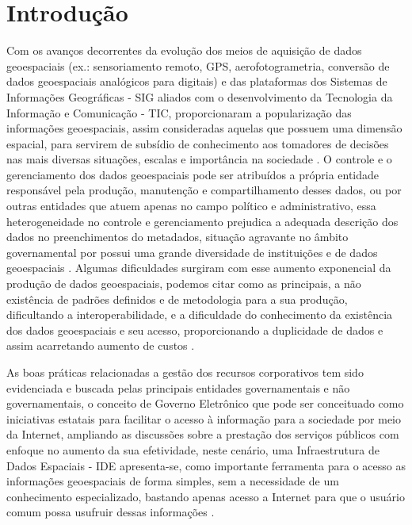 \documentclass[preprint,authoryear,11pt]{elsarticle}
\begin{document}
\section{Introdução}
\label{sec1}
\begin{multicols}{2}

Com os avanços decorrentes da evolução dos meios de aquisição de dados geoespaciais (ex.: sensoriamento remoto, GPS, aerofotogrametria, conversão de dados geoespaciais analógicos para digitais) e das plataformas dos Sistemas de Informações Geográficas - SIG aliados com o desenvolvimento da Tecnologia da Informação e Comunicação - TIC, proporcionaram a popularização das informações geoespaciais, assim consideradas aquelas que possuem uma dimensão espacial, para servirem de subsídio de conhecimento aos tomadores de decisões nas mais diversas situações, escalas e importância na sociedade \citep{Macharis2014AFlanders, Kounadi2016AdaptiveDatasets, Bejar2012AnInfrastructures, Borzacchiello2013EstimatingE-Cadastres, Hamylton2012DevelopmentSeychelles}. O controle e o gerenciamento dos dados geoespaciais pode ser atribuídos a própria entidade responsável pela produção, manutenção e compartilhamento desses dados, ou por outras entidades que atuem apenas no campo político e administrativo, essa heterogeneidade no controle e gerenciamento prejudica a adequada descrição dos dados no preenchimentos do metadados, situação agravante no âmbito governamental por possui uma grande diversidade de instituições e de dados geoespaciais \citep{Grus2011AnGoals}. Algumas dificuldades surgiram com esse aumento exponencial da produção de dados geoespaciais, podemos citar como as principais, a não existência de padrões definidos e de metodologia para a sua produção, dificultando a interoperabilidade, e a dificuldade do conhecimento da existência dos dados geoespaciais e seu acesso, proporcionando a duplicidade de dados e assim acarretando aumento de custos \citep{concar}. 

As boas práticas relacionadas a gestão dos recursos corporativos tem sido evidenciada e buscada pelas principais entidades governamentais e não governamentais, o conceito de Governo Eletrônico \citep{eping} que pode ser conceituado como iniciativas estatais para facilitar o acesso à informação para a sociedade por meio da Internet, ampliando as discussões sobre a prestação dos serviços públicos com enfoque no aumento da sua efetividade, neste cenário, uma Infraestrutura de Dados Espaciais - IDE apresenta-se, como importante ferramenta para o acesso as informações geoespaciais de forma simples, sem a necessidade de um conhecimento especializado, bastando apenas acesso a Internet para que o usuário comum possa usufruir dessas informações \citep{Borzacchiello2013EstimatingE-Cadastres}.


\end{multicols}
\end{document}
